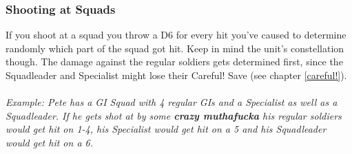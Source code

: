 \documentclass[
	11pt,
	toc=bibliography
	]{article}
\begin{document}
\subsubsection{Shooting at Squads}
If you shoot at a squad you throw a D6 for every hit you've caused to determine randomly which part of the squad got hit. Keep in mind the unit's constellation though. The damage against the regular soldiers gets determined first, since the Squadleader and Specialist might lose their Careful! Save (see chapter \ref{careful!}).\\\\

\textit{Example: Pete has a GI Squad with 4 regular GIs and a Specialist as well as a Squadleader. If he gets shot at by some \textbf{crazy muthafucka} his regular soldiers would get hit on 1-4, his Specialist would get hit on a 5 and his Squadleader would get hit on a 6.}
\end{document}
